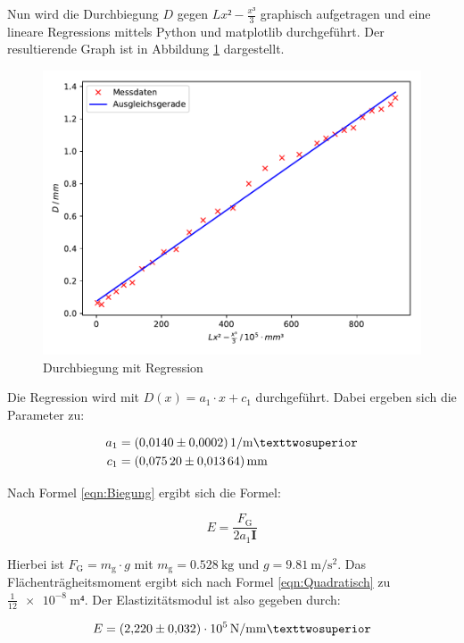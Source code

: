 Nun wird die Durchbiegung $D$ gegen $Lx²-\frac{x³}{3}$ graphisch aufgetragen
und eine lineare Regressions mittels Python und matplotlib durchgeführt.
Der resultierende Graph ist in Abbildung \ref{fig:plot1} dargestellt.

\begin{figure}
  \centering
  \includegraphics[scale=0.8]{content/plot1.pdf}
  \caption{Durchbiegung mit Regression}
  \label{fig:plot1}
\end{figure}

Die Regression wird mit $D(x) = a_1\cdot x + c_1$ durchgeführt. Dabei ergeben 
sich die Parameter zu: 

\begin{align*}
a_1 &= \SI{0.0140+-0.0002}{1\per\meter²}\\
c_1 &= \SI{0.0752+-0.01364}{\milli\meter}
\end{align*}

Nach Formel \eqref{eqn:Biegung} ergibt sich die Formel: 

\begin{equation*}
E = \frac{F_\text{G}}{2a_1\symbf{I}}
\end{equation*}

Hierbei ist $F_\text{G} = m_\text{g}\cdot g$ mit $m_\text{g} = \SI{0.528}{\kilo\gram}$
und $g = \SI{9.81}{\meter\per\second\squared}$. Das Flächenträgheitsmoment
ergibt sich nach Formel \eqref{eqn:Quadratisch} zu $\frac{1}{12}\SI{e-8}{\meter⁴}$. 
Der Elastizitätsmodul ist also gegeben durch: 

\begin{equation*}
E = \SI{2.220+-0.032e5}{\newton\per\milli\meter²}
\end{equation*}

